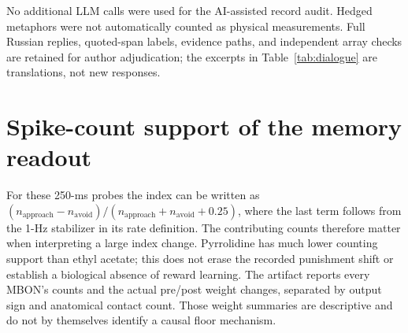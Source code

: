 No additional LLM calls were used for the AI-assisted record audit. Hedged metaphors were not automatically counted as physical measurements. Full Russian replies, quoted-span labels, evidence paths, and independent array checks are retained for author adjudication; the excerpts in Table~\ref{tab:dialogue} are translations, not new responses.

\clearpage
\section{Spike-count support of the memory readout}

For these 250-ms probes the index can be written as $(n_{\mathrm{approach}}-n_{\mathrm{avoid}})/(n_{\mathrm{approach}}+n_{\mathrm{avoid}}+0.25)$, where the last term follows from the 1-Hz stabilizer in its rate definition. The contributing counts therefore matter when interpreting a large index change. Pyrrolidine has much lower counting support than ethyl acetate; this does not erase the recorded punishment shift or establish a biological absence of reward learning. The artifact reports every MBON's counts and the actual pre/post weight changes, separated by output sign and anatomical contact count. Those weight summaries are descriptive and do not by themselves identify a causal floor mechanism.
